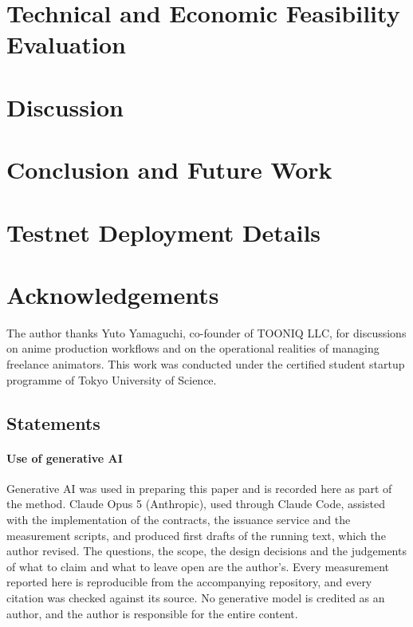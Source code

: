 \documentclass{ledger}
\begin{document}
\section{Technical and Economic Feasibility Evaluation}
\label{sec:evaluation}


\section{Discussion}
\label{sec:discussion}


\section{Conclusion and Future Work}
\label{sec:conclusion}


\appendix
\section{Testnet Deployment Details}



\section*{Acknowledgements}
The author thanks Yuto Yamaguchi, co-founder of TOONIQ LLC, for discussions on
anime production workflows and on the operational realities of managing freelance
animators. This work was conducted under the certified student startup programme
of Tokyo University of Science.

\subsection*{Statements}

\paragraph*{Use of generative AI}
Generative AI was used in preparing this paper and is recorded here as part of the
method. Claude Opus 5 (Anthropic), used through Claude Code, assisted with the
implementation of the contracts, the issuance service and the measurement scripts,
and produced first drafts of the running text, which the author revised. The
questions, the scope, the design decisions and the judgements of what to claim and
what to leave open are the author's. Every measurement reported here is
reproducible from the accompanying repository, and every citation was checked
against its source. No generative model is credited as an author, and the author
is responsible for the entire content.
\end{document}

